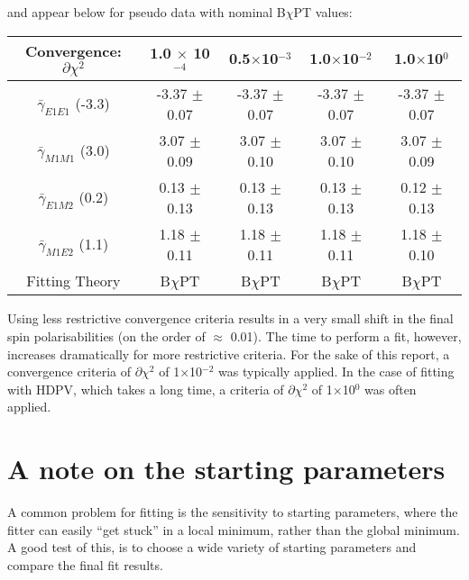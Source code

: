 \documentclass[]{article}
\begin{document}
\noindent and appear below for pseudo data with nominal B$\chi$PT values:

\begin{table}[h!]
	\centering %
	\begin{tabular}{|c|c|c|c|c|} %
		\hline
		Convergence: $\partial\chi^{2}$ & 1.0 $\times$ 10$^{-4}$ & 0.5$\times$10$^{-3}$ & 1.0$\times$10$^{-2}$  &  1.0$\times$10$^{0}$ \\
		\hline %
		$\bar{\gamma}_{E1E1}$ (-3.3) & -3.37 $\pm$ 0.07 & -3.37 $\pm$ 0.07 & -3.37 $\pm$ 0.07 & -3.37 $\pm$ 0.07 \\ 
		$\bar{\gamma}_{M1M1}$ (3.0) & 3.07 $\pm$ 0.09 & 3.07 $\pm$ 0.10 & 3.07 $\pm$ 0.10 & 3.07 $\pm$ 0.09 \\
		$\bar{\gamma}_{E1M2}$ (0.2) & 0.13 $\pm$ 0.13 & 0.13 $\pm$ 0.13 & 0.13 $\pm$ 0.13 & 0.12 $\pm$ 0.13\\
		$\bar{\gamma}_{M1E2}$ (1.1) & 1.18 $\pm$ 0.11 & 1.18 $\pm$ 0.11 & 1.18 $\pm$ 0.11  & 1.18 $\pm$ 0.10\\
		\hline
		Fitting Theory & B$\chi$PT & B$\chi$PT & B$\chi$PT & B$\chi$PT\\
		\hline
	\end{tabular}
\end{table}

\noindent Using less restrictive convergence criteria results in a very small shift in the final spin polarisabilities (on the order of $\approx$ 0.01). The time to perform a fit, however, increases dramatically for more restrictive criteria. For the sake of this report, a convergence criteria of $\partial\chi^{2}$ of 1$\times$10$^{-2}$ was typically applied. In the case of fitting with HDPV, which takes a long time, a criteria of $\partial\chi^{2}$ of 1$\times$10$^{0}$ was often applied.

\section{A note on the starting parameters}

A common problem for fitting is the sensitivity to starting parameters, where the fitter can easily \enquote{get stuck} in a local minimum, rather than the global minimum. A good test of this, is to choose a wide variety of starting parameters and compare the final fit results. 
\end{document}
